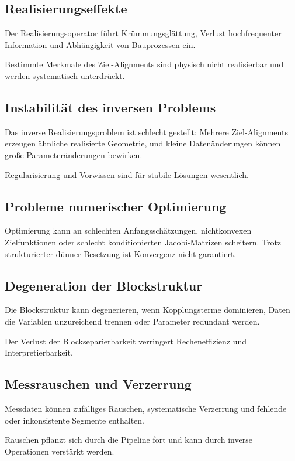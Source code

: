 \subsection{Realisierungseffekte}
Der Realisierungsoperator führt Krümmungsglättung, Verlust hochfrequenter
Information und Abhängigkeit von Bauprozessen ein.
\begin{proposition}
Bestimmte Merkmale des Ziel-Alignments sind physisch nicht realisierbar und
werden systematisch unterdrückt.
\end{proposition}

\subsection{Instabilität des inversen Problems}
Das inverse Realisierungsproblem ist schlecht gestellt: Mehrere Ziel-Alignments
erzeugen ähnliche realisierte Geometrie, und kleine Datenänderungen können
große Parameteränderungen bewirken.
\begin{proposition}
Regularisierung und Vorwissen sind für stabile Lösungen wesentlich.
\end{proposition}

\subsection{Probleme numerischer Optimierung}
Optimierung kann an schlechten Anfangsschätzungen, nichtkonvexen Zielfunktionen
oder schlecht konditionierten Jacobi-Matrizen scheitern. Trotz strukturierter
dünner Besetzung ist Konvergenz nicht garantiert.

\subsection{Degeneration der Blockstruktur}
Die Blockstruktur kann degenerieren, wenn Kopplungsterme dominieren, Daten die
Variablen unzureichend trennen oder Parameter redundant werden.
\begin{proposition}
Der Verlust der Blockseparierbarkeit verringert Recheneffizienz und
Interpretierbarkeit.
\end{proposition}

\subsection{Messrauschen und Verzerrung}
Messdaten können zufälliges Rauschen, systematische Verzerrung und fehlende
oder inkonsistente Segmente enthalten.
\begin{proposition}
Rauschen pflanzt sich durch die Pipeline fort und kann durch inverse
Operationen verstärkt werden.
\end{proposition}

